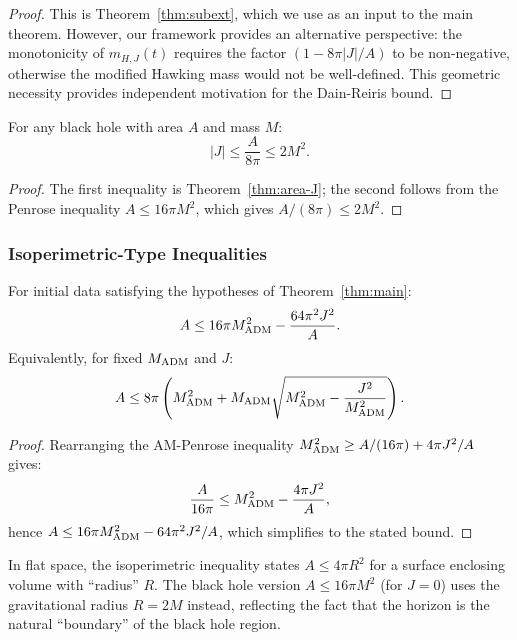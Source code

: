 \begin{proof}
This is Theorem~\ref{thm:subext}, which we use as an input to the main theorem. However, our framework provides an alternative perspective: the monotonicity of $m_{H,J}(t)$ requires the factor $(1 - 8\pi|J|/A)$ to be non-negative, otherwise the modified Hawking mass would not be well-defined. This geometric necessity provides independent motivation for the Dain-Reiris bound.
\end{proof}

\begin{corollary}\label{cor:spin-bound}
For any black hole with area $A$ and mass $M$:
\begin{equation}
    |J| \leq \frac{A}{8\pi} \leq 2M^2.
\end{equation}
\end{corollary}
\begin{proof}
The first inequality is Theorem~\ref{thm:area-J}; the second follows from the Penrose inequality $A \leq 16\pi M^2$, which gives $A/(8\pi) \leq 2M^2$.
\end{proof}

\subsubsection{Isoperimetric-Type Inequalities}

\begin{theorem}\label{thm:isoperimetric}
For initial data satisfying the hypotheses of Theorem~\ref{thm:main}:
\begin{equation}
    A \leq 16\pi M_{\mathrm{ADM}}^2 - \frac{64\pi^2 J^2}{A}.
\end{equation}
Equivalently, for fixed $M_{\mathrm{ADM}}$ and $J$:
\begin{equation}
    A \leq 8\pi\left(M_{\mathrm{ADM}}^2 + M_{\mathrm{ADM}}\sqrt{M_{\mathrm{ADM}}^2 - \frac{J^2}{M_{\mathrm{ADM}}^2}}\right).
\end{equation}
\end{theorem}

\begin{proof}
Rearranging the AM-Penrose inequality $M_{\mathrm{ADM}}^2 \geq A/(16\pi) + 4\pi J^2/A$ gives:
\[
\frac{A}{16\pi} \leq M_{\mathrm{ADM}}^2 - \frac{4\pi J^2}{A},
\]
hence $A \leq 16\pi M_{\mathrm{ADM}}^2 - 64\pi^2 J^2/A$, which simplifies to the stated bound.
\end{proof}

\begin{remark}
In flat space, the isoperimetric inequality states $A \leq 4\pi R^2$ for a surface enclosing volume with ``radius'' $R$. The black hole version $A \leq 16\pi M^2$ (for $J = 0$) uses the gravitational radius $R = 2M$ instead, reflecting the fact that the horizon is the natural ``boundary'' of the black hole region.
\end{remark}


